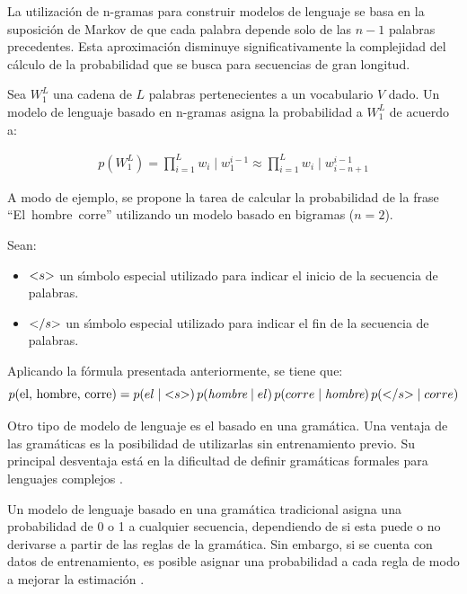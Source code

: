 La utilización de n-gramas para construir modelos de lenguaje se basa en la suposici\'on de Markov de que cada
palabra depende solo de las $n - 1$ palabras precedentes. Esta aproximación disminuye significativamente la
complejidad del c\'alculo de la probabilidad que se busca para secuencias de gran longitud.


Sea $W^L_1$ una cadena de $L $ palabras pertenecientes a un vocabulario $V$ dado. 
Un modelo de lenguaje basado en n-gramas asigna la probabilidad a $W^L_1$ de acuerdo a:

\begin{align}
p(W^L_1) = \displaystyle \prod^L_{i = 1} w_i \mid w^{i - 1}_1 \approx \displaystyle \prod^L_{i = 1} w_i \mid w^{i - 1}_{i - n + 1}
\end{align}

A modo de ejemplo, se propone la tarea de calcular la probabilidad de la frase \mbox{``El hombre corre''}
utilizando un modelo basado en bigramas ($n=2$).

Sean:
\begin{itemize}
 	\item $\text{\textless} s\text{\textgreater}$ un s{\'\i}mbolo especial utilizado para indicar el inicio 
 	de la secuencia de palabras.
  	\item $\text{\textless} /s\text{\textgreater}$ un s{\'\i}mbolo especial utilizado para indicar el fin 
  	de la secuencia de palabras.
\end{itemize} 

Aplicando la f\'ormula presentada anteriormente, se tiene que:
\begin{equation*}
p(\text{el, hombre, corre}) = p(el \mid \text{\textless} s\text{\textgreater}) \, 
p(\emph{\text{hombre}} \mid el) \, p(corre \mid \emph{\text{hombre}}) \, 
p(\text{\textless} /s\text{\textgreater} \mid corre)
\end{equation*}


Otro tipo de modelo de lenguaje es el basado en una gram\'atica. Una ventaja de las gram\'aticas es la posibilidad de
utilizarlas sin entrenamiento previo. Su principal desventaja est\'a en la dificultad de definir gram\'aticas formales
para lenguajes complejos \cite{Wang2000}.

Un modelo de lenguaje basado en una gram\'atica tradicional asigna una probabilidad de 0 o 1 a cualquier secuencia,
dependiendo de si esta puede o no derivarse a partir de las reglas de la gram\'atica. Sin embargo, si se cuenta con
datos de entrenamiento, es posible asignar una probabilidad a cada regla de modo a mejorar 
la estimaci\'on \cite{huang-handbook10}.

